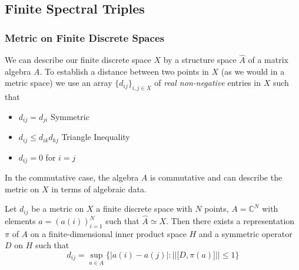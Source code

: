 \subsection{Finite Spectral Triples}
\subsubsection{Metric on Finite Discrete Spaces}
We can describe our finite discrete space $X$ by a structure space $\hat{A}$
of a matrix algebra $A$. To establish a distance between two points in $X$ (as
we would in a metric space) we use an array $\{d_{ij}\}_{i, j \in X}$ of
\textit{real non-negative} entries in $X$ such that
\begin{itemize}
    \item $d_{ij} = d_{ji}$             Symmetric
    \item $d_{ij} \leq d_{ik} d_{kj}$       Triangle Inequality
    \item $d_{ij} = 0$ for $i=j$
\end{itemize}

In the commutative case, the algebra $A$ is commutative and can describe the
metric on $X$ in terms of algebraic data.
\begin{mytheorem}
    Let $d_{ij}$ be a metric on $X$ a finite discrete space with $N$ points, $A = \mathbb{C}^N$
    with elements $a = (a(i))_{i=1}^N$ such that $\hat{A} \simeq X$. Then there exists a
    representation $\pi$ of $A$ on a finite-dimensional inner product space $H$ and a symmetric
    operator $D$ on $H$ such that
    \begin{equation}
        d_{ij} = \sup_{a\in A}\bigg\{\big|a(i)-a(j)\big| : |\big|\big[D,
            \pi(a)]\big|\big| \leq 1\bigg\}
    \end{equation}
\end{mytheorem}

